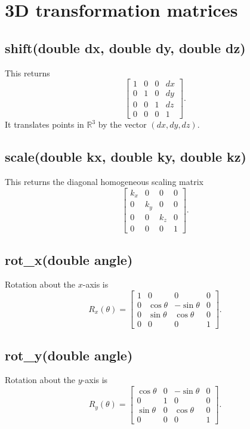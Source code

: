 \documentclass[11pt,a4paper,openany]{book}
\def\code#1{#1}%
\DeclareRobustCommand{\code}[1]{\texttt{\detokenize{#1}}}
\newcommand{\R}{\mathbb{R}}
\begin{document}
\section{3D transformation matrices}

\subsection{\code{shift(double dx, double dy, double dz)}}
This returns
\[
\begin{bmatrix}
1 & 0 & 0 & dx \\
0 & 1 & 0 & dy \\
0 & 0 & 1 & dz \\
0 & 0 & 0 & 1
\end{bmatrix}.
\]
It translates points in \(\R^3\) by the vector \((dx,dy,dz)\).

\subsection{\code{scale(double kx, double ky, double kz)}}
This returns the diagonal homogeneous scaling matrix
\[
\begin{bmatrix}
k_x & 0 & 0 & 0 \\
0 & k_y & 0 & 0 \\
0 & 0 & k_z & 0 \\
0 & 0 & 0 & 1
\end{bmatrix}.
\]

\subsection{\code{rot_x(double angle)}}
Rotation about the \(x\)-axis is
\[
R_x(\theta) =
\begin{bmatrix}
1 & 0 & 0 & 0 \\
0 & \cos\theta & -\sin\theta & 0 \\
0 & \sin\theta & \cos\theta & 0 \\
0 & 0 & 0 & 1
\end{bmatrix}.
\]

\subsection{\code{rot_y(double angle)}}
Rotation about the \(y\)-axis is
\[
R_y(\theta) =
\begin{bmatrix}
\cos\theta & 0 & -\sin\theta & 0 \\
0 & 1 & 0 & 0 \\
\sin\theta & 0 & \cos\theta & 0 \\
0 & 0 & 0 & 1
\end{bmatrix}.
\]
\end{document}
